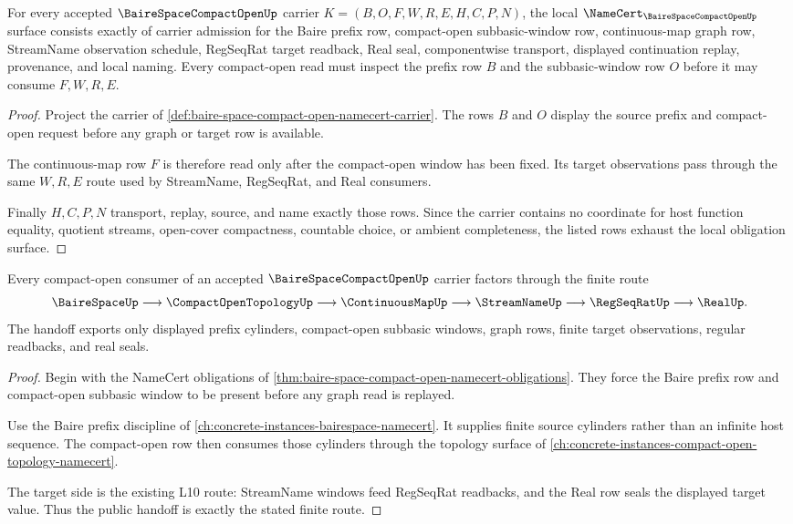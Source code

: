 \begin{theorem}
\label{thm:baire-space-compact-open-namecert-obligations}
For every accepted $\BaireSpaceCompactOpenUp$ carrier $K=(B,O,F,W,R,E,H,C,P,N)$, the local $\NameCert_{\BaireSpaceCompactOpenUp}$ surface consists exactly of carrier admission for the Baire prefix row, compact-open subbasic-window row, continuous-map graph row, StreamName observation schedule, RegSeqRat target readback, Real seal, componentwise transport, displayed continuation replay, provenance, and local naming. Every compact-open read must inspect the prefix row $B$ and the subbasic-window row $O$ before it may consume $F,W,R,E$.
\end{theorem}
\begin{proof}
Project the carrier of \autoref{def:baire-space-compact-open-namecert-carrier}. The rows $B$ and $O$ display the source prefix and compact-open request before any graph or target row is available.

The continuous-map row $F$ is therefore read only after the compact-open window has been fixed. Its target observations pass through the same $W,R,E$ route used by StreamName, RegSeqRat, and Real consumers.

Finally $H,C,P,N$ transport, replay, source, and name exactly those rows. Since the carrier contains no coordinate for host function equality, quotient streams, open-cover compactness, countable choice, or ambient completeness, the listed rows exhaust the local obligation surface.
\end{proof}

\begin{theorem}
\label{thm:baire-space-compact-open-prefix-handoff}
Every compact-open consumer of an accepted $\BaireSpaceCompactOpenUp$ carrier factors through the finite route
$$
\BaireSpaceUp \longrightarrow \CompactOpenTopologyUp \longrightarrow \ContinuousMapUp \longrightarrow \StreamNameUp \longrightarrow \RegSeqRatUp \longrightarrow \RealUp .
$$
The handoff exports only displayed prefix cylinders, compact-open subbasic windows, graph rows, finite target observations, regular readbacks, and real seals.
\end{theorem}
\begin{proof}
Begin with the NameCert obligations of \autoref{thm:baire-space-compact-open-namecert-obligations}. They force the Baire prefix row and compact-open subbasic window to be present before any graph read is replayed.

Use the Baire prefix discipline of \autoref{ch:concrete-instances-bairespace-namecert}. It supplies finite source cylinders rather than an infinite host sequence. The compact-open row then consumes those cylinders through the topology surface of \autoref{ch:concrete-instances-compact-open-topology-namecert}.

The target side is the existing L10 route: StreamName windows feed RegSeqRat readbacks, and the Real row seals the displayed target value. Thus the public handoff is exactly the stated finite route.
\end{proof}

